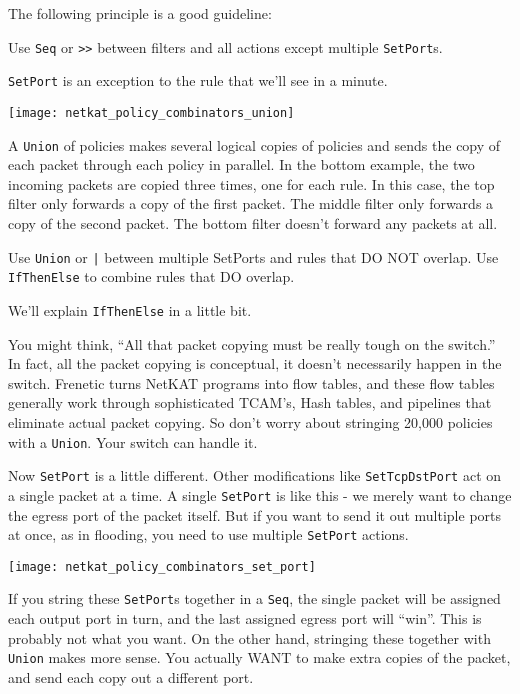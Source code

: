The following principle is a good guideline:  

\begin{principle}
\item Use \texttt{Seq} or \texttt{>>} between filters and all actions except multiple \texttt{SetPort}s.
\end{principle}

\texttt{SetPort} is an exception to the rule that we'll see in a minute.  

\texttt{[image: netkat\_policy\_combinators\_union]}

A \texttt{Union} of policies makes several logical copies of policies and sends the copy of each packet
through each policy in parallel.  In the bottom example, the two incoming packets are copied three times, one
for each rule.  In this case, the top filter only forwards a copy of the first packet.
The middle filter only forwards a copy of the second packet.
The bottom filter doesn't forward any packets at all.  

\begin{principle}
Use \texttt{Union} or \texttt{|} between multiple SetPorts and rules that DO NOT overlap.
Use \texttt{IfThenElse} to combine rules that DO overlap. 
\end{principle}

We'll explain \texttt{IfThenElse} in a little bit.  

You might think, ``All that packet copying must be really tough on the switch.''  In fact, all the 
packet copying is conceptual, it doesn't necessarily happen in the switch.  Frenetic turns NetKAT
programs into flow tables, and these flow tables generally work through sophisticated TCAM's, Hash tables,
and pipelines that eliminate actual packet copying.  So don't worry about stringing 20,000 policies
with a \texttt{Union}.  Your switch can handle it.   

Now \texttt{SetPort} is a little different.  Other modifications like \texttt{SetTcpDstPort} act on a single packet at a time.
A single \texttt{SetPort} is like this - we merely want to change the egress port of the packet itself.  But if 
you want to send it out multiple ports at once, as in flooding, you need to use multiple \texttt{SetPort} actions.

\texttt{[image: netkat\_policy\_combinators\_set\_port]}

If you string these \texttt{SetPort}s together in a \texttt{Seq}, the single packet will be assigned each output port in turn, and
the last assigned egress port will ``win''.  
This is probably not what you want.  
On the other hand, stringing these together with \texttt{Union} makes more sense.  You actually WANT to make
extra copies of the packet, and send each copy out a different port.  

